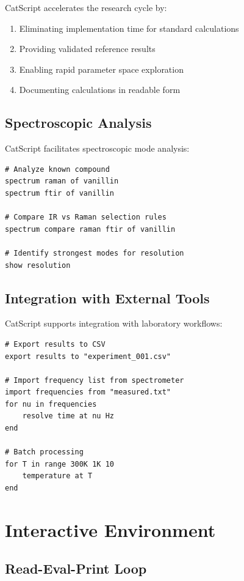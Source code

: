 \documentclass[twocolumn,10pt]{article}
\begin{document}
CatScript accelerates the research cycle by:
\begin{enumerate}
    \item Eliminating implementation time for standard calculations
    \item Providing validated reference results
    \item Enabling rapid parameter space exploration
    \item Documenting calculations in readable form
\end{enumerate}

\subsection{Spectroscopic Analysis}

CatScript facilitates spectroscopic mode analysis:

\begin{lstlisting}[caption={Spectroscopic analysis workflow}]
# Analyze known compound
spectrum raman of vanillin
spectrum ftir of vanillin

# Compare IR vs Raman selection rules
spectrum compare raman ftir of vanillin

# Identify strongest modes for resolution
show resolution
\end{lstlisting}

\subsection{Integration with External Tools}

CatScript supports integration with laboratory workflows:

\begin{lstlisting}[caption={Integration features}]
# Export results to CSV
export results to "experiment_001.csv"

# Import frequency list from spectrometer
import frequencies from "measured.txt"
for nu in frequencies
    resolve time at nu Hz
end

# Batch processing
for T in range 300K 1K 10
    temperature at T
end
\end{lstlisting}

\section{Interactive Environment}

\subsection{Read-Eval-Print Loop}
\end{document}
